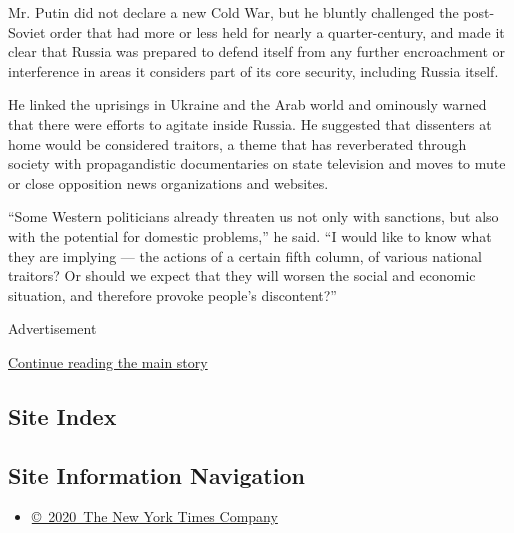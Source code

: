 Mr. Putin did not declare a new Cold War, but he bluntly challenged the
post-Soviet order that had more or less held for nearly a
quarter-century, and made it clear that Russia was prepared to defend
itself from any further encroachment or interference in areas it
considers part of its core security, including Russia itself.

He linked the uprisings in Ukraine and the Arab world and ominously
warned that there were efforts to agitate inside Russia. He suggested
that dissenters at home would be considered traitors, a theme that has
reverberated through society with propagandistic documentaries on state
television and moves to mute or close opposition news organizations and
websites.

``Some Western politicians already threaten us not only with sanctions,
but also with the potential for domestic problems,'' he said. ``I would
like to know what they are implying --- the actions of a certain fifth
column, of various national traitors? Or should we expect that they will
worsen the social and economic situation, and therefore provoke people's
discontent?''

Advertisement

\protect\hyperlink{after-bottom}{Continue reading the main story}

\hypertarget{site-index}{%
\subsection{Site Index}\label{site-index}}

\hypertarget{site-information-navigation}{%
\subsection{Site Information
Navigation}\label{site-information-navigation}}

\begin{itemize}
\tightlist
\item
  \href{https://help.nytimes.com/hc/en-us/articles/115014792127-Copyright-notice}{©~2020~The
  New York Times Company}
\end{itemize}

